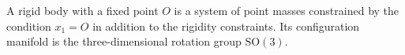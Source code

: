 A rigid body with a fixed point $O$ is a system of point masses constrained by the condition $x_1 = O$ in addition to the rigidity constraints. Its configuration manifold is the three-dimensional rotation group $\mathrm{SO}(3)$.
